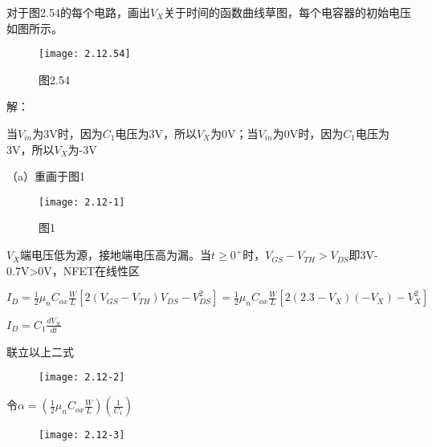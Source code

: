 




对于图2.54的每个电路，画出$V_X$关于时间的函数曲线草图，每个电容器的初始电压如图所示。

		\begin{figure}[H] %
	\begin{minipage}{\linewidth}
		\texttt{[image: 2.12.54]}
	\end{minipage}
	\caption*{图2.54} %
\end{figure}

解：

\scalebox{3}{（a）}

当$V_{in}$为3V时，因为$C_1$电压为3V，所以$V_X$为0V；当$V_{in}$为0V时，因为$C_1$电压为3V，所以$V_X$为-3V

（a）重画于图1

		\begin{figure}[H] %
	\begin{minipage}{\linewidth}
		\texttt{[image: 2.12-1]}
	\end{minipage}
	\caption*{图1} %
\end{figure}

$V_X$端电压低为源，接地端电压高为漏。当$t \geqslant 0^+$时，$V_{GS}-V_{TH}>V_{DS}$即3V-0.7V>0V，NFET在线性区

$I_D=\frac{1}{2}\mu_nC_{ox}\frac{W}{L}[2(V_{GS}-V_{TH})V_{DS}-V_{DS}^2]=\frac{1}{2}\mu_nC_{ox}\frac{W}{L}[2(2.3-V_X)(-V_{X})-V_{X}^2]$

$I_D=C_1\frac{dV_X}{dt}$

联立以上二式

\begin{figure}[H] %
	\begin{minipage}{\linewidth}
		\texttt{[image: 2.12-2]}
	\end{minipage}
\end{figure}

令$\alpha=(\frac{1}{2}\mu_nC_{ox}\frac{W}{L})(\frac{1}{C_1})$

\begin{figure}[H] %
	\begin{minipage}{\linewidth}
		\texttt{[image: 2.12-3]}
	\end{minipage}
\end{figure}

